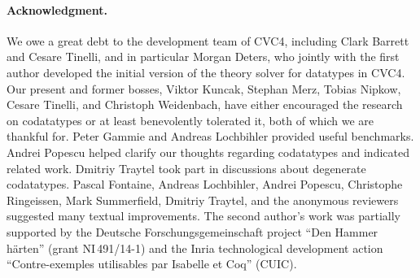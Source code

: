 \documentclass[smallcondensed,draft]{svjour3}
\begin{document}

{
\def\ackname{Acknowledgment}
\paragraph{\ackname.}
We owe a great debt to the development team of CVC4,
including Clark Barrett and Cesare Tinelli,
and in particular Morgan Deters,
who jointly with the first author
developed the initial version
of the theory solver for datatypes in CVC4.
%
Our present and former bosses, Viktor Kuncak, Stephan Merz, Tobias Nipkow,
Cesare Tinelli, and Christoph Weidenbach, have either encouraged the research on
codatatypes or at least benevolently tolerated it, both of which we are thankful
for.
%
Peter Gammie and Andreas Lochbihler provided useful benchmarks.
Andrei Popescu helped clarify our thoughts regarding codatatypes and indicated
related work. Dmitriy Traytel took part in discussions about degenerate
codatatypes.
%
Pascal Fontaine, Andreas Lochbihler, Andrei Popescu, Christophe Ringeissen, Mark
Summerfield, Dmitriy Traytel, and the anonymous reviewers suggested many
textual improvements. The second author's work was partially supported by
the Deutsche
Forschungs\-gemein\-schaft %
project ``Den Hammer h\"arten'' (grant NI\,491\slash 14-1)
and the Inria technological development
action ``Contre-exemples utilisables par Isabelle et Coq'' (CUIC).

}


{}
\end{document}
